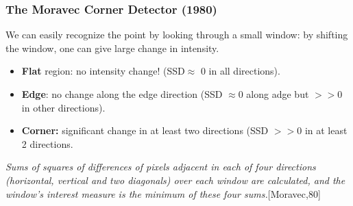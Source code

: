 \documentclass[a4paper,12 pt]{article}
\theoremstyle{definition}
\theoremstyle{remark}
\theoremstyle{definition}
\theoremstyle{definition}
\theoremstyle{definition}
\theoremstyle{remark}
\theoremstyle{definition}
\begin{document}
\subsubsection*{The Moravec Corner Detector (1980)}
We can easily recognize the point by looking through a small window: by shifting the window, one can give large change in intensity.
\begin{itemize}
\item \textbf{Flat} region: no intensity change! (SSD$\approx$ 0 in all directions).
\item \textbf{Edge}: no change along the edge direction (SSD $\approx$0 along adge but $>>0$ in other directions).
\item \textbf{Corner:} significant change in at least two directions (SSD $>>0$ in at least 2 directions.
\end{itemize}
\textit{Sums of squares of differences of pixels adjacent in each of four directions (horizontal, vertical and two diagonals) over each window are calculated, and the window's interest measure is the minimum of these four sums.}[Moravec,80]
\end{document}
